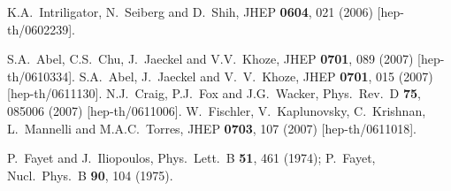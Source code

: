 \documentclass[12pt]{article}
\begin{document}
\begin{thebibliography}{999}
  K.A.~Intriligator, N.~Seiberg and D.~Shih,
  JHEP {\bf 0604}, 021 (2006)
  [hep-th/0602239].

%  
S.A.~Abel, C.S.~Chu, J.~Jaeckel and V.V.~Khoze,
  JHEP {\bf 0701}, 089 (2007)
  [hep-th/0610334].
S.A.~Abel, J.~Jaeckel and V.~V.~Khoze,
  JHEP {\bf 0701}, 015 (2007)
  [hep-th/0611130].
%  
  N.J.~Craig, P.J.~Fox and J.G.~Wacker,
  Phys.\ Rev.\  D {\bf 75}, 085006 (2007)
  [hep-th/0611006].
%  
  W.~Fischler, V.~Kaplunovsky, C.~Krishnan, L.~Mannelli and M.A.C.~Torres,
  JHEP {\bf 0703}, 107 (2007)
  [hep-th/0611018].

P.~Fayet and J.~Iliopoulos,
  Phys.\ Lett.\ B {\bf 51}, 461 (1974);
P.~Fayet, 
  Nucl.\ Phys.\ B {\bf 90}, 104 (1975).


\end{thebibliography}
\end{document}
